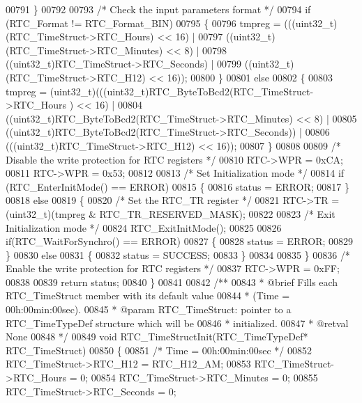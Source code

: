\begin{DoxyCode}
00791   \}
00792 
00793   \textcolor{comment}{/* Check the input parameters format */}
00794   \textcolor{keywordflow}{if} (RTC\_Format != RTC_Format_BIN)
00795   \{
00796     tmpreg = (((uint32\_t)(RTC\_TimeStruct->RTC_Hours) << 16) |
00797              ((uint32\_t)(RTC\_TimeStruct->RTC_Minutes) << 8) |
00798              ((uint32\_t)RTC\_TimeStruct->RTC_Seconds) |
00799              ((uint32\_t)(RTC\_TimeStruct->RTC_H12) << 16));
00800   \}
00801   \textcolor{keywordflow}{else}
00802   \{
00803     tmpreg = (uint32\_t)(((uint32\_t)RTC_ByteToBcd2(RTC\_TimeStruct->RTC_Hours
      ) << 16) |
00804                    ((uint32\_t)RTC_ByteToBcd2(RTC\_TimeStruct->RTC_Minutes) << 8) |
00805                    ((uint32\_t)RTC_ByteToBcd2(RTC\_TimeStruct->RTC_Seconds)) |
00806                    (((uint32\_t)RTC\_TimeStruct->RTC_H12) << 16));
00807   \}
00808 
00809   \textcolor{comment}{/* Disable the write protection for RTC registers */}
00810   RTC->WPR = 0xCA;
00811   RTC->WPR = 0x53;
00812 
00813   \textcolor{comment}{/* Set Initialization mode */}
00814   \textcolor{keywordflow}{if} (RTC_EnterInitMode() == ERROR)
00815   \{
00816     status = ERROR;
00817   \}
00818   \textcolor{keywordflow}{else}
00819   \{
00820     \textcolor{comment}{/* Set the RTC\_TR register */}
00821     RTC->TR = (uint32\_t)(tmpreg & RTC_TR_RESERVED_MASK);
00822 
00823     \textcolor{comment}{/* Exit Initialization mode */}
00824     RTC_ExitInitMode();
00825 
00826     \textcolor{keywordflow}{if}(RTC_WaitForSynchro() == ERROR)
00827     \{
00828       status = ERROR;
00829     \}
00830     \textcolor{keywordflow}{else}
00831     \{
00832       status = SUCCESS;
00833     \}
00834 
00835   \}
00836   \textcolor{comment}{/* Enable the write protection for RTC registers */}
00837   RTC->WPR = 0xFF;
00838 
00839   \textcolor{keywordflow}{return} status;
00840 \}
00841 
00842 \textcolor{comment}{/**}
00843 \textcolor{comment}{  * @brief  Fills each RTC\_TimeStruct member with its default value}
00844 \textcolor{comment}{  *         (Time = 00h:00min:00sec).}
00845 \textcolor{comment}{  * @param  RTC\_TimeStruct: pointer to a RTC\_TimeTypeDef structure which will be }
00846 \textcolor{comment}{  *         initialized.}
00847 \textcolor{comment}{  * @retval None}
00848 \textcolor{comment}{  */}
00849 \textcolor{keywordtype}{void} RTC_TimeStructInit(RTC\_TimeTypeDef* RTC\_TimeStruct)
00850 \{
00851   \textcolor{comment}{/* Time = 00h:00min:00sec */}
00852   RTC\_TimeStruct->RTC_H12 = RTC_H12_AM;
00853   RTC\_TimeStruct->RTC_Hours = 0;
00854   RTC\_TimeStruct->RTC_Minutes = 0;
00855   RTC\_TimeStruct->RTC_Seconds = 0;

\end{DoxyCode}
